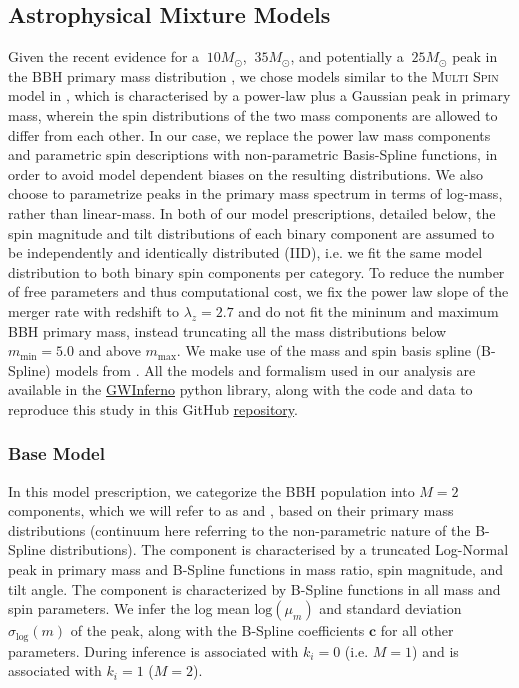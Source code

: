 \subsection{Astrophysical Mixture Models} \label{sec:astromodels} 

Given the recent evidence for a $~10 M_{\odot}$, $~35 M_{\odot}$, and potentially a $~25 M_{\odot}$ peak in the BBH primary mass distribution \citep{2111.03634, 2022ApJ...928..155T, 10.3847/2041-8213/aa9bf6, 10.3847/1538-4357/aab34c, 10.3847/2041-8213/ab3800, 2021ApJ...913L...7A}, we chose models similar to the \textsc{Multi Spin} model in \cite{2021ApJ...913L...7A}, which is characterised by a power-law plus a Gaussian peak in primary mass, wherein the spin distributions of the two mass components are allowed to differ from each other. In our case, we replace the power law mass components and parametric spin descriptions with non-parametric Basis-Spline functions, in order to avoid model dependent biases on the resulting distributions.
We also choose to parametrize peaks in the primary mass spectrum in terms of log-mass, rather than linear-mass. 
In both of our model prescriptions, detailed below, the spin magnitude and tilt distributions of each binary component are assumed to be independently and identically distributed (IID), i.e. we fit the same model distribution to both binary spin components per category. To reduce the number of free parameters and thus computational cost, we fix the power law slope of the merger rate with redshift to $\lambda_z=2.7$ and do not fit the mininum and maximum BBH primary mass, instead truncating all the mass distributions below $m_\text{min} = 5.0$ and above $m_\text{max}$. We make use of the mass and spin basis spline (B-Spline) models from \cite{2022arXiv221012834E}. All the models and formalism used in our analysis are available in the \href{https://git.ligo.org/bruce.edelman/gwinferno}{GWInferno} python library, along with the code and data to reproduce this study in this GitHub \href{https://github.com/jaxeng/paper}{repository}. 



\subsubsection{Base Model}
In this model prescription, we categorize the BBH population into $M=2$ components, which we will refer to as \first{} and \contB{}, based on their primary mass distributions (continuum here referring to the non-parametric nature of the B-Spline distributions). The \first{} component is characterised by a truncated Log-Normal peak in primary mass and B-Spline functions in mass ratio, spin magnitude, and tilt angle. The \contB{} component is characterized by B-Spline functions in all mass and spin parameters. We infer the log mean $\text{log}(\mu_m)$ and standard deviation $\sigma_\text{log}(m)$ of the peak, along with the B-Spline coefficients $\mathbf{c}$ for all other parameters. During inference \first{} is associated with $k_i = 0$ (i.e. $M=1$) and \contB{} is associated with $k_i = 1$ ($M=2$).

